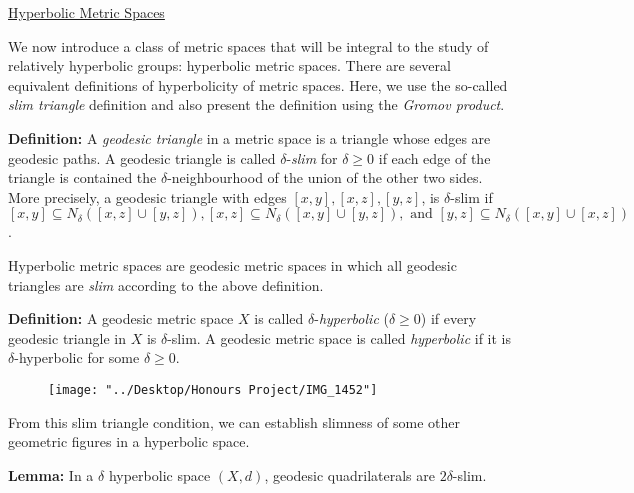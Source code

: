 \documentclass[12pt]{article}
\newcommand{\vs}{\vskip10pt}
\begin{document}
 	\vs
 	
	\underline{Hyperbolic Metric Spaces}
	
	\vs 
	
	We now introduce a class of metric spaces that will be integral to the study of relatively hyperbolic groups: hyperbolic metric spaces. There are several equivalent definitions of hyperbolicity of metric spaces. Here, we use the so-called \textit{slim triangle} definition and also present the definition using the \textit{Gromov product}. 
	
	\vs 
	
	\textbf{Definition: } A \textit{geodesic triangle} in a metric space is a triangle whose edges are geodesic paths. A geodesic triangle is called $\delta$-\textit{slim} for $\delta \geq 0$ if each edge of the triangle is contained the $\delta$-neighbourhood of the union of the other two sides. More precisely, a geodesic triangle with edges $[x,y], [x,z], [y,z]$, is $\delta$-slim if $[x,y] \subseteq N_{\delta} ([x,z] \cup [y,z]), [x,z] \subseteq N_{\delta} ([x,y] \cup [y,z]), \text{ and } [y,z] \subseteq N_{\delta} ([x,y] \cup [x,z])$.
	
	\vs 
	
	Hyperbolic metric spaces are geodesic metric spaces in which all geodesic triangles are \textit{slim} according to the above definition.
	
	\vs 
	
	\newpage
	\textbf{Definition: } A geodesic metric space $X$ is called $\delta$-\textit{hyperbolic} ($\delta \geq 0$) if every geodesic triangle in $X$ is $\delta$-slim. A geodesic metric space is called \textit{hyperbolic} if it is $\delta$-hyperbolic for some $\delta \geq 0$.
	
	\begin{figure} [H]
		\centering
		\texttt{[image: "../Desktop/Honours Project/IMG\_1452"]}
		\caption{}
		\label{fig:img1452}
	\end{figure}
	
	\vs 
	
	From this slim triangle condition, we can establish slimness of some other geometric figures in a hyperbolic space.
	
	\vs 
	
	\textbf{Lemma: } In a $\delta$ hyperbolic space $(X,d)$, geodesic quadrilaterals are $2\delta$-slim. 
	
\end{document}
